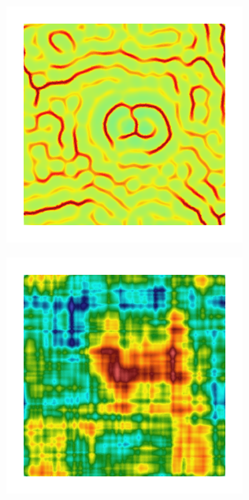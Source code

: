 \begin{figure}[!htb]
\begin{subfigure}[b]{0.15\textwidth}
    \end{subfigure}
    \begin{subfigure}[b]{0.15\textwidth}
        \includegraphics[width=\textwidth]{past/figures/d_sqexp_cartesian_20_20_rho_0_seed_a.png}
    \end{subfigure}
    \begin{subfigure}[b]{0.15\textwidth}
        \includegraphics[width=\textwidth]{past/figures/Gc_exp_cartesian_20_20_rho_0_seed_b.png}

\end{subfigure}
\end{figure}
